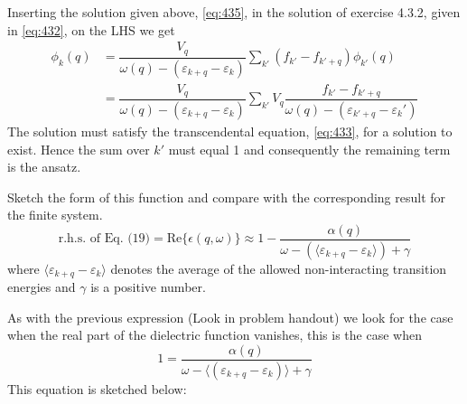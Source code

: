 \begin{solution}
Inserting the solution given above, \eqref{eq:435}, in the solution of exercise 4.3.2, given in \eqref{eq:432}, on the LHS we get
\begin{equation}
\begin{split}
    \phi_{k}(q) &= \dfrac{V_q}{\omega(q) - (\varepsilon_{k+q}-\varepsilon_k)}\sum_{k'}(f_{k'} - f_{k'+q}) \phi_{k'}(q) \\&= \dfrac{V_q}{\omega(q) - (\varepsilon_{k+q}-\varepsilon_k)}\sum_{k'}V_q\dfrac{f_{k'} - f_{k'+q}}{\omega(q) - (\varepsilon_{k'+q}-\varepsilon_k')}
\end{split}
\end{equation}
The solution must satisfy the transcendental equation, \eqref{eq:433}, for a solution to exist. Hence the sum over $k'$ must equal 1 and consequently the remaining term is the ansatz.
\end{solution}

\begin{exercise}
Sketch the form of this function and compare with the corresponding result for the finite system.
\begin{equation}
    \text{r.h.s. of Eq. (19)} = \mathrm{Re}\{\epsilon(q, \omega)\} \approx 1 - \dfrac{\alpha(q)}{\omega - (\langle\varepsilon_{k+q} - \varepsilon_{k}\rangle) + \gamma}
\end{equation}
where $\langle\varepsilon_{k+q} - \varepsilon_{k}\rangle$ denotes the average of the allowed non-interacting transition energies and $\gamma$ is a positive number.
\end{exercise}
\begin{solution}
As with the previous expression (Look in problem handout) we look for the case when the real part of the dielectric function vanishes, this is the case when
\begin{equation}
    1 = \frac{\alpha(q)}{\omega - \langle (\varepsilon_{k+q} - \varepsilon_k) \rangle + \gamma}
\end{equation}
This equation is sketched below:
\begin{figure}[h!]
\centering
{}
\end{figure}
\end{solution}
